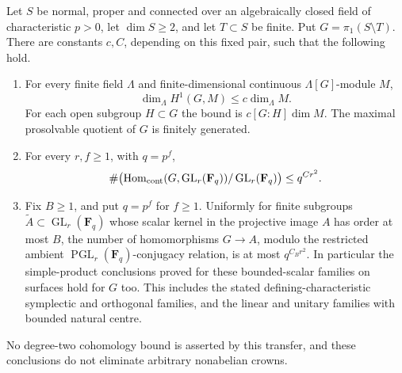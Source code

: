 \begin{corollary}
\label{D:normal-finite-puncture-quantitative-transfer}
Let $S$ be normal, proper and connected over an algebraically closed
field of characteristic $p>0$, let $\dim S\ge2$, and let $T\subset S$
be finite. Put $G=\pi_1(S\setminus T)$. There are constants $c,C$,
depending on this fixed pair, such that the following hold.

\begin{enumerate}
\item For every finite field $\Lambda$ and finite-dimensional continuous
$\Lambda[G]$-module $M$,
\[
                    \dim_\Lambda H^1(G,M)\le c\dim_\Lambda M.
\]
For each open subgroup $H\subset G$ the bound is
$c[G:H]\dim M$. The maximal prosolvable quotient of $G$ is finitely
generated.
\item For every $r,f\ge1$, with $q=p^f$,
\[
 \#\bigl(\operatorname{Hom}_{\rm cont}(G,\operatorname{GL}_r(\mathbf F_q))
                 /\operatorname{GL}_r(\mathbf F_q)\bigr)
                  \le q^{Cr^2}.
\]
\item Fix $B\ge1$, and put $q=p^f$ for $f\ge1$. Uniformly for finite subgroups
$\widetilde A\subset\operatorname{GL}_r(\mathbf F_q)$ whose scalar
kernel in the projective image $A$ has order at most $B$, the number
of homomorphisms $G\to A$, modulo the restricted ambient
$\operatorname{PGL}_r(\mathbf F_q)$-conjugacy relation, is at most
$q^{C_Br^2}$. In particular the simple-product conclusions proved for
these bounded-scalar families on surfaces hold for $G$ too. This
includes the stated defining-characteristic symplectic and orthogonal
families, and the linear and unitary families with bounded natural
centre.
\end{enumerate}
No degree-two cohomology bound is asserted by this transfer, and these
conclusions do not eliminate arbitrary nonabelian crowns.
\end{corollary}

